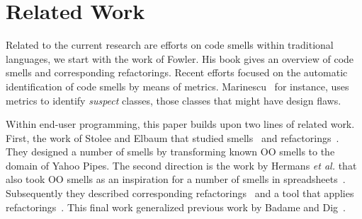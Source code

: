 \documentclass[conference]{IEEEtran}
\begin{document}
\section{Related Work}

\label{sec:related_work}
Related to the current research are efforts on code smells within traditional languages, we start with the work of Fowler\cite{Fowl1999}. His book gives an overview of code smells and corresponding refactorings. Recent efforts focused on the automatic identification of code smells by means of metrics. Marinescu~\cite{Mari2001} for instance, uses metrics to identify \emph{suspect} classes, those classes that might have design flaws. 

Within end-user programming, this paper builds upon two lines of related work. First, the work of Stolee and Elbaum that studied smells~\cite{StoleeTSE2013} and refactorings~\cite{Stolee2011}. They designed a number of smells by transforming known OO smells to the domain of Yahoo Pipes. The second direction is the work by Hermans \emph{et al.} that also took OO smells as an inspiration for a number of smells in spreadsheets~\cite{Hermans2012intra, Hermans2012inter}. Subsequently they described corresponding refactorings~\cite{Hermans2012intraExt} and a tool that applies refactorings~\cite{hermans2014bumblebee}. This final work generalized previous work by Badame and Dig~\cite{badame2012refactoring}.

\end{document}

